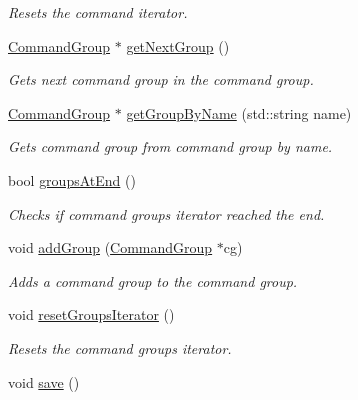\begin{DoxyCompactItemize}
\begin{DoxyCompactList}\small\item\em Resets the command iterator. \end{DoxyCompactList}\item 
\hyperlink{class_r_c_f_1_1_server_1_1_command_group}{Command\+Group} $\ast$ \hyperlink{class_r_c_f_1_1_server_1_1_command_group_aa8eb515abb92af67a5f20843254d0158}{get\+Next\+Group} ()
\begin{DoxyCompactList}\small\item\em Gets next command group in the command group. \end{DoxyCompactList}\item 
\hyperlink{class_r_c_f_1_1_server_1_1_command_group}{Command\+Group} $\ast$ \hyperlink{class_r_c_f_1_1_server_1_1_command_group_a44a2fa9f126fe347cbec59a6b49d224f}{get\+Group\+By\+Name} (std\+::string name)
\begin{DoxyCompactList}\small\item\em Gets command group from command group by name. \end{DoxyCompactList}\item 
bool \hyperlink{class_r_c_f_1_1_server_1_1_command_group_a4d94f7d1e85eb4e376672eba681b44a6}{groups\+At\+End} ()
\begin{DoxyCompactList}\small\item\em Checks if command groups iterator reached the end. \end{DoxyCompactList}\item 
void \hyperlink{class_r_c_f_1_1_server_1_1_command_group_a0aba7531b512d67875a0eaee44595c50}{add\+Group} (\hyperlink{class_r_c_f_1_1_server_1_1_command_group}{Command\+Group} $\ast$cg)
\begin{DoxyCompactList}\small\item\em Adds a command group to the command group. \end{DoxyCompactList}\item 
\hypertarget{class_r_c_f_1_1_server_1_1_command_group_acd9685a983f5cf58640e068469813fb3}{}void \hyperlink{class_r_c_f_1_1_server_1_1_command_group_acd9685a983f5cf58640e068469813fb3}{reset\+Groups\+Iterator} ()\label{class_r_c_f_1_1_server_1_1_command_group_acd9685a983f5cf58640e068469813fb3}

\begin{DoxyCompactList}\small\item\em Resets the command groups iterator. \end{DoxyCompactList}\item 
\hypertarget{class_r_c_f_1_1_server_1_1_command_group_af396c9bfa8fc2a761a7212876e1c808e}{}void \hyperlink{class_r_c_f_1_1_server_1_1_command_group_af396c9bfa8fc2a761a7212876e1c808e}{save} ()\label{class_r_c_f_1_1_server_1_1_command_group_af396c9bfa8fc2a761a7212876e1c808e}


\end{DoxyCompactItemize}
